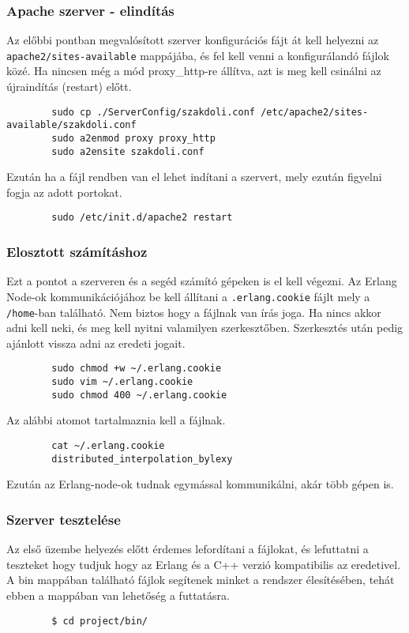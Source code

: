 \subsubsection{Apache szerver - elindítás}
	Az előbbi pontban megvalósított szerver konfigurációs fájt át kell helyezni az \texttt{apache2/sites-available} mappájába, és fel kell venni a konfigurálandó fájlok közé. Ha nincsen még a mód proxy\_http-re állítva, azt is meg kell csinálni az újraindítás (restart) előtt. 
	\begin{verbatim}
		sudo cp ./ServerConfig/szakdoli.conf /etc/apache2/sites-available/szakdoli.conf
		sudo a2enmod proxy proxy_http
		sudo a2ensite szakdoli.conf
	\end{verbatim}
	Ezután ha a fájl rendben van el lehet indítani a szervert, mely ezután figyelni fogja az adott portokat.
	\begin{verbatim}
		sudo /etc/init.d/apache2 restart
	\end{verbatim}

\subsubsection{Elosztott számításhoz}
	Ezt a pontot a szerveren és a segéd számító gépeken is el kell végezni. \newline
	Az Erlang Node-ok kommunikációjához be kell állítani a \texttt{.erlang.cookie} fájlt mely a \texttt{/home}-ban található. 
	Nem biztos hogy a fájlnak van írás joga. Ha nincs akkor adni kell neki, és meg kell nyitni valamilyen szerkesztőben.
	Szerkesztés után pedig ajánlott vissza adni az eredeti jogait.
	\begin{verbatim}
		sudo chmod +w ~/.erlang.cookie
		sudo vim ~/.erlang.cookie
		sudo chmod 400 ~/.erlang.cookie
	\end{verbatim}
	Az alábbi atomot tartalmaznia kell a fájlnak.
	\begin{verbatim}
		cat ~/.erlang.cookie
		distributed_interpolation_bylexy
	\end{verbatim}
	Ezután az Erlang-node-ok tudnak egymással kommunikálni, akár több gépen is.

\subsubsection{Szerver tesztelése}
	Az első üzembe helyezés előtt érdemes lefordítani a fájlokat, és lefuttatni a teszteket hogy tudjuk hogy az Erlang és a C++ verzió kompatibilis az eredetivel. \newline
	A bin mappában található fájlok segítenek minket a rendszer élesítésében, tehát ebben a mappában van lehetőség a futtatásra.  
	\begin{verbatim}
		$ cd project/bin/
	\end{verbatim}

